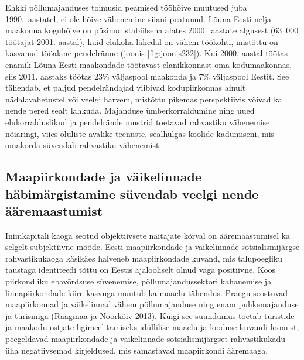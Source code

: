 \documentclass[]{book}
\begin{document}
Ehkki põllumajanduses toimusid peamised tööhõive muutused juba 1990.~aastatel, ei ole hõive vähenemine
siiani peatunud. Lõuna-Eesti nelja maakonna koguhõive on püsinud stabiilsena alates 2000.~aastate algusest
(63~000 töötajat 2001. aastal), kuid elukoha lähedal on vähem töökohti, mistõttu on kasvanud tööalane
pendelränne (joonis \ref{fig:joonis232}). Kui 2000. aastal töötas enamik Lõuna-Eesti maakondade töötavast elanikkonnast
oma kodumaakonnas, siis 2011. aastaks töötas 23\% väljaspool maakonda ja 7\% väljaspool Eestit. See
tähendab, et paljud pendelrändajad viibivad kodupiirkonnas ainult nädalavahetustel või veelgi harvem,
mistõttu pikemas perspektiivis võivad ka nende pered sealt lahkuda. Majanduse ümberkorraldumine ning
uued elukorralduslikud ja pendelrände mustrid toetavad rahvastiku vähenemise nõiaringi, viies oluliste
avalike teenuste, sealhulgas koolide kadumiseni, mis omakorda süvendab rahvastiku vähenemist.

\hypertarget{maapiirkondade-ja-vaikelinnade-habimargistamine-suvendab-veelgi-nende-aaremaastumist}{%
\subsection{Maapiirkondade ja väikelinnade häbimärgistamine süvendab veelgi nende ääremaastumist}\label{maapiirkondade-ja-vaikelinnade-habimargistamine-suvendab-veelgi-nende-aaremaastumist}}

Inimkapitali kaoga seotud objektiivsete näitajate kõrval on ääremaastumisel ka selgelt subjektiivne mõõde.
Eesti maapiirkondade ja väikelinnade sotsialismijärgse rahvastikukaoga käsikäes halveneb maapiirkondade
kuvand, mis talupoegliku taustaga identiteedi tõttu on Eestis ajalooliselt olnud väga positiivne. Koos
piirkondliku ebavõrdsuse süvenemise, põllumajandussektori kahanemise ja linnapiirkondade kiire kasvuga
muutub ka maaelu tähendus. Praegu seostuvad maapiirkonnad ja väikelinnad vähem põllumajanduse ning
enam puhkemajanduse ja turismiga (Raagmaa ja Noorkõiv 2013). Kuigi see suundumus toetab turistide ja
maakodu ostjate ligimeelitamiseks idüllilise maaelu ja looduse kuvandi loomist, peegeldavad
maapiirkondade ja väikelinnade sotsialismijärgset rahvastikukadu üha negatiivsemad kirjeldused, mis
samastavad maapiirkondi ääremaaga.
\end{document}
